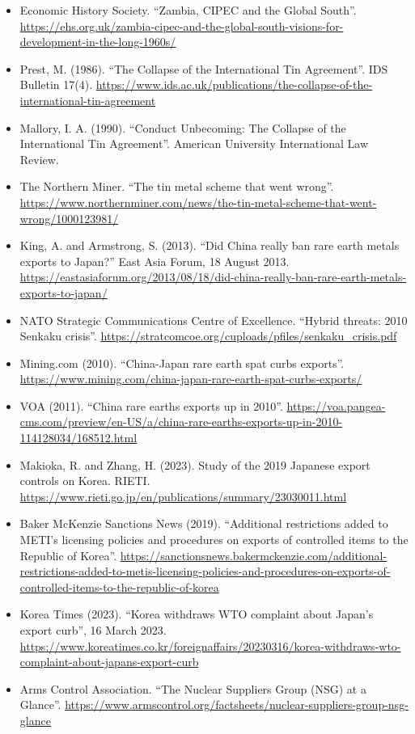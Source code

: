 \documentclass[11pt]{article}
\begin{document}
\begin{itemize}[leftmargin=1.5em, itemindent=-1.5em, label={}, itemsep=2pt]
\item Economic History Society. ``Zambia, CIPEC and the Global South''. \url{https://ehs.org.uk/zambia-cipec-and-the-global-south-visions-for-development-in-the-long-1960s/}
\item Prest, M. (1986). ``The Collapse of the International Tin Agreement''. IDS Bulletin 17(4). \url{https://www.ids.ac.uk/publications/the-collapse-of-the-international-tin-agreement}
\item Mallory, I. A. (1990). ``Conduct Unbecoming: The Collapse of the International Tin Agreement''. American University International Law Review.
\item The Northern Miner. ``The tin metal scheme that went wrong''. \url{https://www.northernminer.com/news/the-tin-metal-scheme-that-went-wrong/1000123981/}
\item King, A. and Armstrong, S. (2013). ``Did China really ban rare earth metals exports to Japan?'' East Asia Forum, 18 August 2013. \url{https://eastasiaforum.org/2013/08/18/did-china-really-ban-rare-earth-metals-exports-to-japan/}
\item NATO Strategic Communications Centre of Excellence. ``Hybrid threats: 2010 Senkaku crisis''. \url{https://stratcomcoe.org/cuploads/pfiles/senkaku_crisis.pdf}
\item Mining.com (2010). ``China-Japan rare earth spat curbs exports''. \url{https://www.mining.com/china-japan-rare-earth-spat-curbs-exports/}
\item VOA (2011). ``China rare earths exports up in 2010''. \url{https://voa.pangea-cms.com/preview/en-US/a/china-rare-earths-exports-up-in-2010-114128034/168512.html}
\item Makioka, R. and Zhang, H. (2023). Study of the 2019 Japanese export controls on Korea. RIETI. \url{https://www.rieti.go.jp/en/publications/summary/23030011.html}
\item Baker McKenzie Sanctions News (2019). ``Additional restrictions added to METI's licensing policies and procedures on exports of controlled items to the Republic of Korea''. \url{https://sanctionsnews.bakermckenzie.com/additional-restrictions-added-to-metis-licensing-policies-and-procedures-on-exports-of-controlled-items-to-the-republic-of-korea}
\item Korea Times (2023). ``Korea withdraws WTO complaint about Japan's export curb'', 16 March 2023. \url{https://www.koreatimes.co.kr/foreignaffairs/20230316/korea-withdraws-wto-complaint-about-japans-export-curb}
\item Arms Control Association. ``The Nuclear Suppliers Group (NSG) at a Glance''. \url{https://www.armscontrol.org/factsheets/nuclear-suppliers-group-nsg-glance}

\end{itemize}
\end{document}
